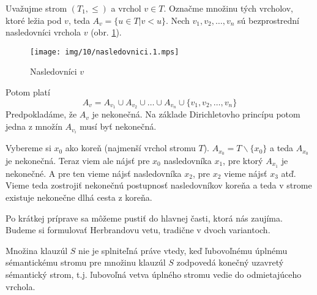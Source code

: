 \begin{dokaz} 
    Uvažujme strom $(T_1,\leq)$ a vrchol $v \in T$.
    Označme množinu tých vrcholov, ktoré ležia pod $v$, teda
    $A_v = \{ u \in T | v <u \}$.
    Nech $v_1, v_2, \dots, v_n$ sú bezprostrední nasledovníci vrchola $v$ (obr.
    \ref{fig:nasledovnici}). 
    \begin{figure}[h]
        \centering\texttt{[image: img/10/nasledovnici.1.mps]}
        \caption{Nasledovníci $v$}
        \label{fig:nasledovnici}
    \end{figure}
    Potom platí
    \begin{equation*}
        A_v = A_{v_1} \cup A_{v_2} \cup \ldots \cup A_{v_n}
        \cup \{v_1, v_2, \ldots, v_n\}
    \end{equation*}
    Predpokladáme, že $A_v$ je nekonečná.
    Na základe Dirichletovho princípu potom jedna z množín $A_{v_i}$
    musí byť nekonečná.

    Vybereme si $x_0$ ako koreň (najmenší vrchol stromu $T$). 
    $A_{x_0} = T \backslash \{x_0\}$ a teda $A_{x_0}$ je nekonečná.
    Teraz viem ale nájsť pre $x_0$ nasledovníka $x_1$, pre ktorý
    $A_{x_1}$ je nekonečné. A pre ten vieme nájsť nasledovníka $x_2$,
    pre $x_2$ vieme nájsť $x_3$ atď.
    Vieme teda zostrojiť nekonečnú postupnosť nasledovníkov koreňa a
    teda v strome existuje nekonečne dlhá cesta z koreňa.
\end{dokaz}

Po krátkej príprave sa môžeme pustiť do hlavnej časti, ktorá nás
zaujíma. Budeme si formulovať Herbrandovu vetu, tradične v dvoch
variantoch.

\begin{veta}
    Množina klauzúl $S$ nie je splniteľná práve vtedy,
    keď ľubovoľnému úplnému sémantickému stromu pre množinu klauzúl
    $S$ zodpovedá konečný uzavretý sémantický strom,
    t.j. ľubovoľná vetva úplného stromu vedie do odmietajúceho vrchola.
\end{veta}

